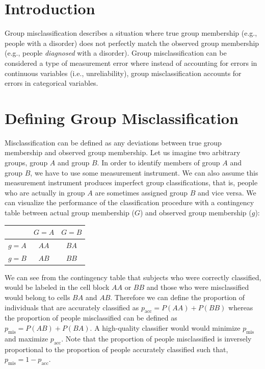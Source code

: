 \documentclass[
  letterpaper,
  DIV=11,
  numbers=noendperiod]{scrreprt}
\begin{document}
\hypertarget{introduction-2}{%
\section{Introduction}\label{introduction-2}}

Group misclassification describes a situation where true group
membership (e.g., people with a disorder) does not perfectly match the
observed group membership (e.g., people \emph{diagnosed} with a
disorder). Group misclassification can be considered a type of
measurement error where instead of accounting for errors in continuous
variables (i.e., unreliability), group misclassification accounts for
errors in categorical variables.

\hypertarget{defining-group-misclassification}{%
\section{Defining Group
Misclassification}\label{defining-group-misclassification}}

Misclassification can be defined as any deviations between true group
membership and observed group membership. Let us imagine two arbitrary
groups, group \(A\) and group \(B\). In order to identify members of
group \(A\) and group \(B\), we have to use some measurement instrument.
We can also assume this measurement instrument produces imperfect group
classifications, that is, people who are actually in group \(A\) are
sometimes assigned group \(B\) and vice versa. We can visualize the
performance of the classification procedure with a contingency table
between actual group membership (\(G\)) and observed group membership
(\(g\)):

\begin{longtable}[]{@{}lcc@{}}
\toprule\noalign{}
& \(G=A\) & \(G=B\) \\
\midrule\noalign{}
\endhead
\bottomrule\noalign{}
\endlastfoot
\(g=A\) & \(AA\) & \(BA\) \\
\(g=B\) & \(AB\) & \(BB\) \\
\end{longtable}

We can see from the contingency table that subjects who were correctly
classified, would be labeled in the cell block \(AA\) or \(BB\) and
those who were misclassified would belong to cells \(BA\) and \(AB\).
Therefore we can define the proportion of individuals that are
accurately classified as \(p_{\text{acc}} = P(AA) + P(BB)\) whereas the
proportion of people misclassified can be defined as
\(p_{\text{mis}} = P(AB)+ P(BA)\). A high-quality classifier would would
minimize \(p_{\text{mis}}\) and maximize \(p_{\text{acc}}\). Note that
the proportion of people misclassified is inversely proportional to the
proportion of people accurately classified such that,
\(p_{\text{mis}} = 1-p_{\text{acc}}\).
\end{document}
